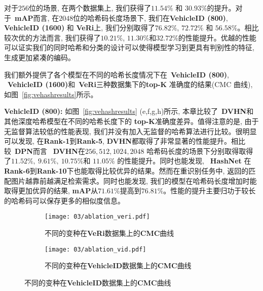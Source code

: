 对于$256$位的场景, 在两个数据集上, 我们获得了$11.54 \%$ 和 $30.93 \%$的提升。对于~\textbf{mAP}而言, 在$2048$位的哈希码长度场景下, 我们在\textbf{VehicleID (800)}, \textbf{VehicleID (1600)} 和 \textbf{VeRi}上, 我们分别取得了$76.82 \%$, $72.72 \%$ 和 $56.58 \%$。相比较次优的方法而言, 我们获得了$10.21 \%$, $11.30 \%$和$32.72\%$的性能提升。优越的性能可以证实我们的同时哈希和分类的设计可以使得模型学习到更具有判别性的特征, 生成更加紧凑的编码。\par 
我们额外提供了各个模型在不同的哈希长度情况下在~\textbf{VehicleID (800)}, ~\textbf{VehicleID (1600)}和~\textbf{VeRi}三种数据集下的\textbf{top-K} 准确度的结果(CMC 曲线), 如图~\ref{fig:vehashresults}所示。 \par
\textbf{VehicleID (800):} 如图~\ref{fig:vehashresults} (e,f,g,h)所示, 本章比较了~\textbf{DVHN}和其他深度哈希模型在不同的哈希长度下的 \textbf{top-K}准确度差异。值得注意的是, 由于无监督算法较低的性能表现, 我们并没有加入无监督的哈希算法进行比较。很明显可以发现, 在\textbf{Rank-1}到\textbf{Rank-5}, \textbf{DVHN}都取得了非常显著的性能提升。相比较~\textbf{DPN}而言 ~\textbf{DVHN}在$256, 512, 1024, 2048$ 哈希码长度的场景下分别取得取得了$11.52\%,~9.61\%,~10.75\% $和 $11.05\%$ 的性能提升。同时也能发现, ~\textbf{HashNet} 在\textbf{Rank-6}到\textbf{Rank-10}下也能取得比较优异的结果。然而在重识别任务中, 返回的匹配图片越靠前越满足检索需求。同时也能发现, 我们的模型在哈希码长度增加时能取得更加优异的结果, \textbf{mAP}从$71.61\%$提高到$76.81\%$。性能的提升主要归功于较长的哈希码可以保存更多的相似度信息。 \par


\begin{figure}[!htp]
    \centering
    \begin{subfigure}{0.45\textwidth}
      \centering
      \texttt{[image: 03/ablation\_veri.pdf]}
      \caption{不同的变种在\textbf{VeRi}数据集上的\textbf{CMC}曲线}
    \end{subfigure}
    \hspace{1cm}
    \begin{subfigure}{0.45\textwidth}
      \centering
      \texttt{[image: 03/ablation\_vid.pdf]}
      \caption{不同的变种在\textbf{VehicleID}数据集上的\textbf{CMC}曲线}
    \end{subfigure}
    \label{fig:ablationcmc}
  \end{figure}

